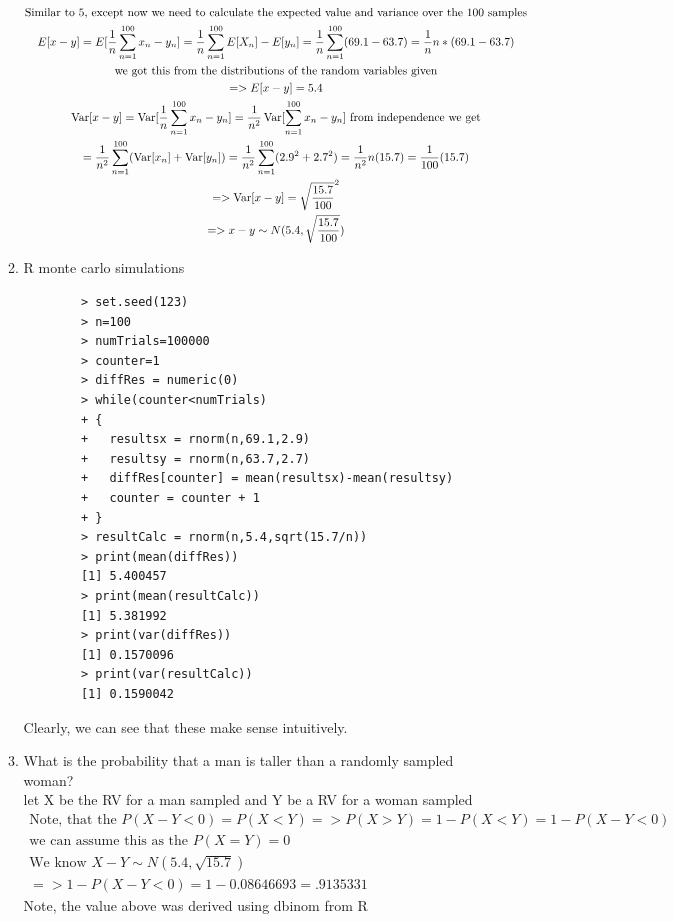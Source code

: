 \documentclass[11pt]{article}
\newcommand{\Var}{\mathop{\rm Var}}
\begin{document}
\begin{enumerate}
\begin{enumerate}
\begin{gather}
		\text{Similar to 5, except now we need to calculate the expected value and variance over the 100 samples}\\
		E[x-y] = E[\frac{1}{n}\sum_{n=1}^{100} x_n-y_n] =\frac{1}{n}\sum_{n=1}^{100} E[X_n] - E[y_n] =\frac{1}{n}\sum_{n=1}^{100} (69.1-63.7) = \frac{1}{n} n*(69.1-63.7) \\
		\text{we got this from the distributions of the random variables given}\\
		=> E[x-y] = 5.4\\
		\Var[x-y] = \Var[\frac{1}{n}\sum_{n=1}^{100} x_n-y_n] =\frac{1}{n^2}\Var[\sum_{n=1}^{100} x_n-y_n] \text{ from independence we get}\\
		= \frac{1}{n^2}\sum_{n=1}^{100} (\Var[x_n]+\Var[y_n]) = \frac{1}{n^2}\sum_{n=1}^{100} (2.9^2+2.7^2) = \frac{1}{n^2}n (15.7) = \frac{1}{100}(15.7) \\
		=> \Var[x-y] = \sqrt{\frac{15.7}{100}}^2\\
		=>
		x-y \sim N(5.4,\sqrt{\frac{15.7}{100}})
	\end{gather}
	\item R monte carlo simulations 
	\begin{verbatim}
		> set.seed(123)
		> n=100
		> numTrials=100000
		> counter=1
		> diffRes = numeric(0)
		> while(counter<numTrials)
		+ {
		+   resultsx = rnorm(n,69.1,2.9)
		+   resultsy = rnorm(n,63.7,2.7)
		+   diffRes[counter] = mean(resultsx)-mean(resultsy)
		+   counter = counter + 1
		+ }
		> resultCalc = rnorm(n,5.4,sqrt(15.7/n))
		> print(mean(diffRes))
		[1] 5.400457
		> print(mean(resultCalc))
		[1] 5.381992
		> print(var(diffRes))
		[1] 0.1570096
		> print(var(resultCalc))
		[1] 0.1590042
	\end{verbatim}
	Clearly, we can see that these make sense intuitively.\\
	\item What is the probability that a man is taller than a randomly sampled woman?\\
	let X be the RV for a man sampled and Y be a RV for a woman sampled
	\begin{gather}
		\text{Note, that the } P(X-Y<0) = P(X<Y) => P(X>Y) = 1 - P(X<Y) = 1 -P(X-Y<0) \\
		\text{we can assume this as the } P(X=Y) = 0\\
		\text{We know } X-Y \sim N(5.4,\sqrt{15.7})\\
		=> 1-P(X-Y<0) = 1 - 0.08646693 = .9135331
	\end{gather}
	Note, the value above was derived using dbinom from R

\end{enumerate}
\end{enumerate}
\end{document}
